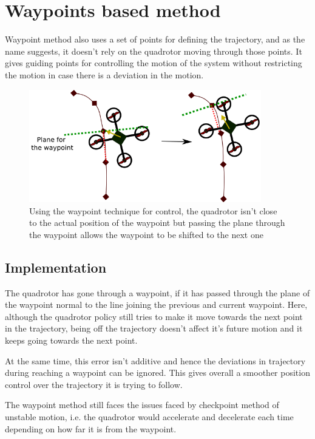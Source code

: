 \documentclass[hidelinks,BTech]{iitmdiss}
\begin{document}
\section{Waypoints based method}
Waypoint method also uses a set of points for defining the trajectory, and as the name suggests, it doesn't rely on the quadrotor moving through those points. It gives guiding points for controlling the motion of the system without restricting the motion in case there is a deviation in the motion. 

\begin{figure}[H]
  \centering
    \includegraphics[width=0.9\textwidth]{Waypoints_trajectory.png}
    \caption{Using the waypoint technique for control, the quadrotor isn't close to the actual position of the waypoint but passing the plane through the waypoint allows the waypoint to be shifted to the next one}
\end{figure}

\subsection*{Implementation}
The quadrotor has gone through a waypoint, if it has passed through the plane of the waypoint normal to the line joining the previous and current waypoint. Here, although the quadrotor policy still tries to make it move towards the next point in the trajectory, being off the trajectory doesn't affect it's future motion and it keeps going towards the next point. 

At the same time, this error isn't additive and hence the deviations in trajectory during reaching a waypoint can be ignored. This gives overall a smoother position control over the trajectory it is trying to follow.

The waypoint method still faces the issues faced by checkpoint method of unstable motion, i.e. the quadrotor would accelerate and decelerate each time depending on how far it is from the waypoint.
\end{document}
